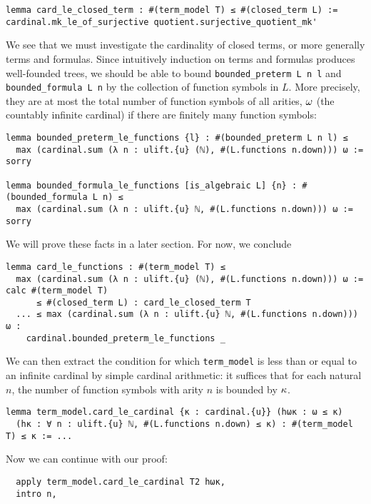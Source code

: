 \begin{lstlisting}
lemma card_le_closed_term : #(term_model T) ≤ #(closed_term L) :=
cardinal.mk_le_of_surjective quotient.surjective_quotient_mk' \end{lstlisting}

We see that we must investigate the cardinality of
closed terms, or more generally terms and formulas.
Since intuitively induction on terms and formulas
produces well-founded trees,
we should be able to bound \texttt{bounded\_preterm L n l}
and \texttt{bounded\_formula L n} by the collection of function symbols in $L$.
More precisely,
they are at most the total number of function symbols of all arities,
$\omega$ (the countably infinite cardinal)
if there are finitely many function symbols:
\begin{lstlisting}
lemma bounded_preterm_le_functions {l} : #(bounded_preterm L n l) ≤
  max (cardinal.sum (λ n : ulift.{u} (ℕ), #(L.functions n.down))) ω := sorry

lemma bounded_formula_le_functions [is_algebraic L] {n} : #(bounded_formula L n) ≤
  max (cardinal.sum (λ n : ulift.{u} ℕ, #(L.functions n.down))) ω := sorry \end{lstlisting}

We will prove these facts in a later section. %
For now, we conclude

\begin{lstlisting}
lemma card_le_functions : #(term_model T) ≤
  max (cardinal.sum (λ n : ulift.{u} (ℕ), #(L.functions n.down))) ω :=
calc #(term_model T)
      ≤ #(closed_term L) : card_le_closed_term T
  ... ≤ max (cardinal.sum (λ n : ulift.{u} ℕ, #(L.functions n.down))) ω :
    cardinal.bounded_preterm_le_functions _ \end{lstlisting}

We can then extract the condition for which \texttt{term\_model} is
less than or equal to an infinite cardinal by simple cardinal
arithmetic: it suffices that for each natural $n$,
the number of function symbols with arity $n$ is bounded by $\kappa$.

\begin{lstlisting}
lemma term_model.card_le_cardinal {κ : cardinal.{u}} (hωκ : ω ≤ κ)
  (hκ : ∀ n : ulift.{u} ℕ, #(L.functions n.down) ≤ κ) : #(term_model T) ≤ κ := ... \end{lstlisting}

Now we can continue with our proof:

\begin{lstlisting}
  apply term_model.card_le_cardinal T2 hωκ,
  intro n, \end{lstlisting}


